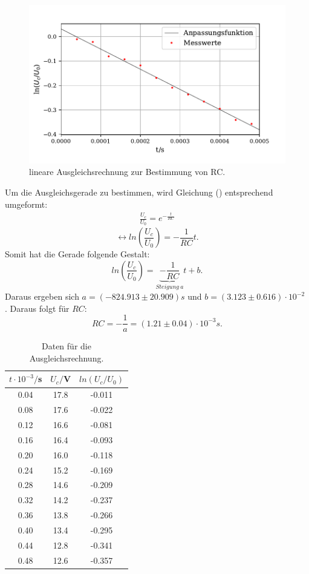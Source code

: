 \begin{figure}
  \centering
  \includegraphics{plot1.pdf}
  \caption{lineare Ausgleichsrechnung zur Bestimmung von RC.}
  \label{fig:plot}
\end{figure}
\noindent Um die Ausgleichsgerade zu bestimmen, wird Gleichung () entsprechend umgeformt:
\begin{align*}
    \frac{U_c}{U_0} = e^{-\frac{t}{RC}}
\end{align*}
\begin{equation*}
    \leftrightarrow ln{(\frac{U_c}{U_0})} = -\frac{1}{RC}t .
\end{equation*}
Somit hat die Gerade folgende Gestalt:
\begin{equation}
    ln{(\frac{U_c}{U_0})} = \underbrace{-\frac{1}{RC}}_{Steigung \: a}t + b .
\end{equation}
Daraus ergeben sich $a = (-824.913 \pm 20.909) s$ und $b = (3.123 \pm 0.616) \cdot 10^{-2} $ .
Daraus folgt für $RC$:
\begin{equation*}
    RC = -\frac{1}{a} = (1.21 \pm 0.04)\cdot 10^{-3} s.
\end{equation*}

\begin{table}[H]
  \centering
  \caption{Daten für die Ausgleichsrechnung.}
  \label{tab:Parameter}
  \begin{tabular}{c c c}
    \toprule
    $t\cdot 10^{-3}/$s & $U_c/$V & $ln(U_c/U_0)$  \\
    \bottomrule
     0.04 & 17.8  & -0.011 \\
     0.08 & 17.6  & -0.022\\
     0.12& 16.6  & -0.081\\
     0.16& 16.4  & -0.093\\
     0.20 & 16.0  &-0.118\\
     0.24 & 15.2  &-0.169\\
     0.28 & 14.6  &-0.209\\
     0.32& 14.2 & -0.237\\
     0.36& 13.8  & -0.266\\
     0.40& 13.4  & -0.295\\
     0.44& 12.8  & -0.341\\
     0.48& 12.6  & -0.357\\
     
    \bottomrule
  \end{tabular}
\end{table}


